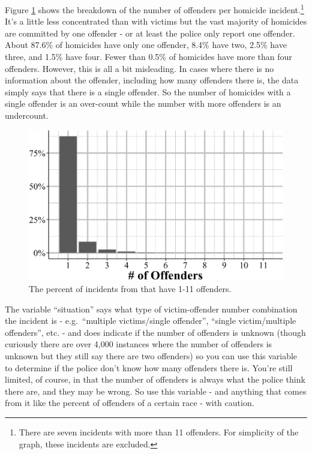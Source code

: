 \documentclass[
  12pt,
  openany]{book}
\begin{document}
Figure \ref{fig:numberSHROffenders} shows the breakdown of the number of offenders per homicide incident.\footnote{There are seven incidents with more than 11 offenders. For simplicity of the graph, these incidents are excluded.} It's a little less concentrated than with victims but the vast majority of homicides are committed by one offender - or at least the police only report one offender. About 87.6\% of homicides have only one offender, 8.4\% have two, 2.5\% have three, and 1.5\% have four. Fewer than 0.5\% of homicides have more than four offenders. However, this is all a bit misleading. In cases where there is no information about the offender, including how many offenders there is, the data simply says that there is a single offender. So the number of homicides with a single offender is an over-count while the number with more offenders is an undercount.

\begin{figure}

{\centering \includegraphics[width=0.9\linewidth]{06_shr_files/figure-latex/numberSHROffenders-1} 

}

\caption{The percent of incidents from  that have 1-11 offenders.}\label{fig:numberSHROffenders}
\end{figure}

The variable ``situation'' says what type of victim-offender number combination the incident is - e.g.~``multiple victims/single offender'', ``single victim/multiple offenders'', etc. - and does indicate if the number of offenders is unknown (though curiously there are over 4,000 instances where the number of offenders is unknown but they still say there are two offenders) so you can use this variable to determine if the police don't know how many offenders there is. You're still limited, of course, in that the number of offenders is always what the police think there are, and they may be wrong. So use this variable - and anything that comes from it like the percent of offenders of a certain race - with caution.
\end{document}
